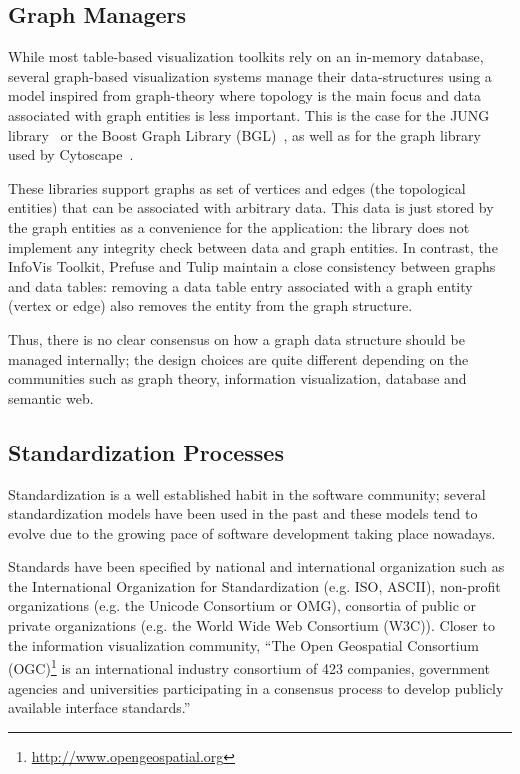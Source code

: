 \subsection{Graph Managers}


While most table-based visualization toolkits rely on an in-memory
database, several graph-based visualization systems manage their
data-structures using a model inspired from graph-theory where
topology is the main focus and data associated with graph entities is
less important.  This is the case for the JUNG library~\cite{jung2003}
or the Boost Graph Library (BGL)~\cite{BGL}, as well as for the graph
library used by Cytoscape~\cite{Cytoscape}.

These libraries support graphs as set of vertices and edges (the
topological entities) that can be associated with arbitrary data.
This data is just stored by the graph entities as a convenience for
the application: the library does not implement any integrity check
between data and graph entities.  In contrast, the InfoVis Toolkit,
Prefuse and Tulip maintain a close consistency between graphs and data
tables: removing a data table entry associated with a graph entity
(vertex or edge) also removes the entity from the graph structure.

Thus, there is no clear consensus on how a graph data structure should
be managed internally; the design choices are quite different
depending on the communities such as graph theory, information
visualization, database and semantic web.


\subsection{Standardization Processes}

Standardization is a well established habit in the software community;
several standardization models have been used in the past and these
models tend to evolve due to the growing pace of software development
taking place nowadays.

Standards have been specified by national and international
organization such as the International Organization for
Standardization (e.g. ISO, ASCII), non-profit organizations (e.g. the
Unicode Consortium or OMG), consortia of public or private
organizations (e.g. the World Wide Web Consortium (W3C)). Closer to
the information visualization community, ``The Open Geospatial
Consortium (OGC)\footnote{\url{http://www.opengeospatial.org}} is an
international industry consortium of 423 companies, government
agencies and universities participating in a consensus process to
develop publicly available interface standards.''

